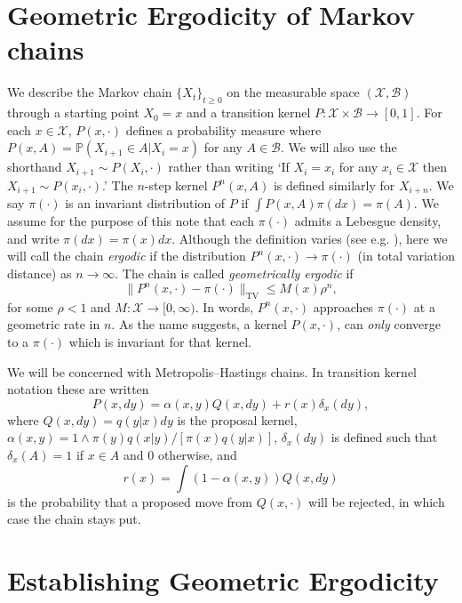 \documentclass{article}
\newcommand{\X}{\mathcal{X}}
\newcommand{\B}{\mathcal{B}}
\newcommand{\TV}{\text{TV}}
\begin{document}
\section{Geometric Ergodicity of Markov chains}

We describe the Markov chain $\{ X_t \}_{t \geq 0}$ on the measurable space $(\mathcal{X},\mathcal{B})$ through a starting point $X_0 = x$ and a transition kernel $P: \X \times \B \to [0,1]$.  For each $x \in \X$, $P(x,\cdot)$ defines a probability measure where $P(x,A) = \mathbb{P}(X_{i+1} \in A |X_i = x)$ for any $A \in \B$.  We will also use the shorthand $X_{i+1} \sim P(X_i,\cdot)$ rather than writing `If $X_i = x_i$ for any $x_i \in \X$ then $X_{i+1} \sim P(x_i,\cdot)$.'  The $n$-step kernel $P^n(x,A)$ is defined similarly for $X_{i+n}$.  We say $\pi(\cdot)$ is an invariant distribution of $P$ if $\int P(x,A)\pi(dx) = \pi(A)$.  We assume for the purpose of this note that each $\pi(\cdot)$ admits a Lebesgue density, and write $\pi(dx) = \pi(x)dx$.  Although the definition varies (see e.g. \cite{tierney1994markov, norris1997markov}), here we will call the chain \emph{ergodic} if the distribution $P^n(x,\cdot) \to \pi(\cdot)$ (in total variation distance) as $n \to \infty$.  The chain is called \emph{geometrically ergodic} if
\begin{equation} \label{eqn:geometric_ergodicity}
\| P^n(x,\cdot) - \pi(\cdot) \|_{\TV} \leq M(x)\rho^n,
\end{equation}
for some $\rho < 1$ and $M: \X \to [0,\infty)$.  In words, $P^n(x,\cdot)$ approaches $\pi(\cdot)$ at a geometric rate in $n$.  As the name suggests, a kernel $P(x,\cdot)$, can \emph{only} converge to a $\pi(\cdot)$ which is invariant for that kernel.

We will be concerned with Metropolis--Hastings chains.  In transition kernel notation these are written
\begin{equation}
P(x,dy) = \alpha(x,y)Q(x,dy) + r(x)\delta_x(dy),
\end{equation}
where $Q(x,dy) = q(y|x)dy$ is the proposal kernel, $\alpha(x,y) = 1 \wedge \pi(y)q(x|y)/[\pi(x)q(y|x)]$, $\delta_x(dy)$ is defined such that $\delta_x(A) = 1$ if $x \in A$ and $0$ otherwise, and
\[
r(x) = \int (1-\alpha(x,y))Q(x,dy)
\]
is the probability that a proposed move from $Q(x,\cdot)$ will be rejected, in which case the chain stays put.


\section{Establishing Geometric Ergodicity}
\end{document}
